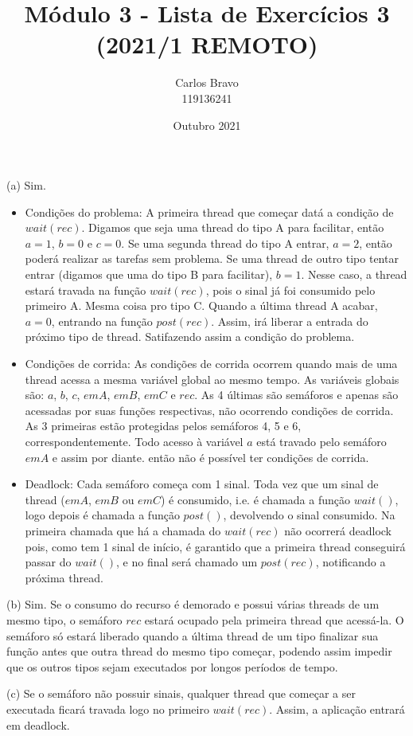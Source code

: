 \documentclass{homework}
\title{Módulo 3 - Lista de Exercícios 3 (2021/1 REMOTO)}
\author{Carlos Bravo\\ 119136241}
\date{Outubro 2021}
\begin{document}
\maketitle
\exercise*
(a) Sim.
\begin{itemize}
    \item Condições do problema: A primeira thread que começar datá a condição de $wait(rec)$. Digamos que seja uma thread do tipo A para facilitar, então $a = 1$, $b = 0$ e $c = 0$. Se uma segunda thread do tipo A entrar, $a=2$, então poderá realizar as tarefas sem problema. Se uma thread de outro tipo tentar entrar (digamos que uma do tipo B para facilitar), $b=1$. Nesse caso, a thread estará travada na função $wait(rec)$, pois o sinal já foi consumido pelo primeiro A. Mesma coisa pro tipo C. Quando a última thread A acabar, $a=0$, entrando na função $post(rec)$. Assim, irá liberar a entrada do próximo tipo de thread. Satifazendo assim a condição do problema. 
    \item Condições de corrida: As condições de corrida ocorrem quando mais de uma thread acessa a mesma variável global ao mesmo tempo. As variáveis globais são: $a$, $b$, $c$, $emA$, $emB$, $emC$ e $rec$. As 4 últimas são semáforos e apenas são acessadas por suas funções respectivas, não ocorrendo condições de corrida. As 3 primeiras estão protegidas pelos semáforos 4, 5 e 6, correspondentemente. Todo acesso à variável $a$ está travado pelo semáforo $emA$ e assim por diante. então não é possível ter condições de corrida.
    \item Deadlock: Cada semáforo começa com 1 sinal. Toda vez que um sinal de thread ($emA$, $emB$ ou $emC$) é consumido, i.e. é chamada a função $wait()$, logo depois é chamada a função $post()$, devolvendo o sinal consumido. Na primeira chamada que há a chamada do $wait(rec)$ não ocorrerá deadlock pois, como tem 1 sinal de início, é garantido que a primeira thread conseguirá passar do $wait()$, e no final será chamado um $post(rec)$, notificando a próxima thread. 
\end{itemize}

(b) Sim. Se o consumo do recurso é demorado e possui várias threads de um mesmo tipo, o semáforo $rec$ estará ocupado pela primeira thread que acessá-la. O semáforo só estará liberado quando a última thread de um tipo finalizar sua função antes que outra thread do mesmo tipo começar, podendo assim impedir que os outros tipos sejam executados por longos períodos de tempo.

(c) Se o semáforo não possuir sinais, qualquer thread que começar a ser executada ficará travada logo no primeiro $wait(rec)$. Assim, a aplicação entrará em deadlock.
\end{document}
